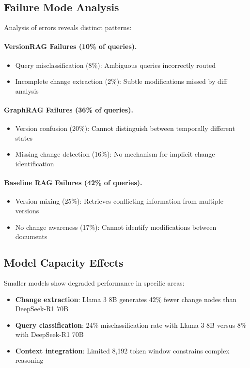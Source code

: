 \subsection{Failure Mode Analysis}

Analysis of errors reveals distinct patterns:

\paragraph{VersionRAG Failures (10\% of queries).}
\begin{itemize}
    \item Query misclassification (8\%): Ambiguous queries incorrectly routed
    \item Incomplete change extraction (2\%): Subtle modifications missed by diff analysis
\end{itemize}

\paragraph{GraphRAG Failures (36\% of queries).}
\begin{itemize}
    \item Version confusion (20\%): Cannot distinguish between temporally different states
    \item Missing change detection (16\%): No mechanism for implicit change identification
\end{itemize}

\paragraph{Baseline RAG Failures (42\% of queries).}
\begin{itemize}
    \item Version mixing (25\%): Retrieves conflicting information from multiple versions
    \item No change awareness (17\%): Cannot identify modifications between documents
\end{itemize}

\subsection{Model Capacity Effects}

Smaller models show degraded performance in specific areas:
\begin{itemize}
    \item \textbf{Change extraction}: Llama 3 8B generates 42\% fewer change nodes than DeepSeek-R1 70B
    \item \textbf{Query classification}: 24\% misclassification rate with Llama 3 8B versus 8\% with DeepSeek-R1 70B
    \item \textbf{Context integration}: Limited 8,192 token window constrains complex reasoning
\end{itemize}

